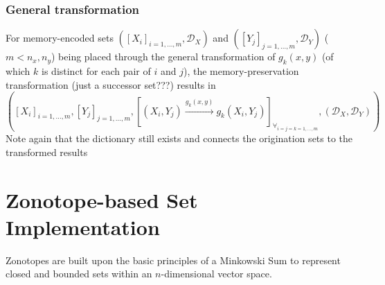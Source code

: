 \documentclass[11pt]{article}
\newcommand{\Dict}{\mathcal{D}} %
\begin{document}
\subsubsection{General transformation}
For memory-encoded sets $([X_{i}]_{i=1,\dots,m}, \Dict_{X})$ and $([Y_{j}]_{j=1,\dots,m}, \Dict_{Y})$ ($m < n_x,n_y$) being placed through the general transformation of $g_{k}(x,y)$ (of which $k$ is distinct for each pair of $i$ and $j$), the memory-preservation transformation (just a successor set???) results in \[
	([X_{i}]_{i=1,\dots,m},[Y_{j}]_{j=1,\dots,m},[(X_{i}, Y_{j}) \overset{g_{k}(x,y)}{\to} g_k(X_{i},Y_{j})]_{\forall_{i=j=k=1,\dots,m}}, (\Dict_{X},\Dict_{Y}))
\]
Note again that the dictionary still exists and connects the origination sets to the transformed results




\section{Zonotope-based Set Implementation}

Zonotopes are built upon the basic principles of a Minkowski Sum to represent closed and bounded sets within an $n$-dimensional vector space.
\end{document}
